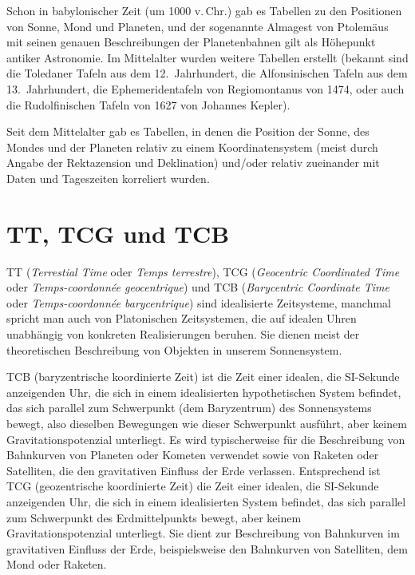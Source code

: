 Schon in babylonischer Zeit (um 1000 v.\,Chr.) gab es Tabellen zu den Positionen von Sonne, Mond und
Planeten, und der sogenannte 
Almagest von Ptolem\"aus mit seinen genauen Beschreibungen der
Planetenbahnen gilt als H\"ohepunkt antiker Astronomie. Im Mittelalter wurden weitere 
Tabellen 
erstellt (bekannt sind die Toledaner Tafeln aus dem 12.\ Jahrhundert, die Alfonsinischen Tafeln 
aus dem 13.\ Jahrhundert, die Ephemeridentafeln von Regiomontanus von 1474, oder 
auch die Rudolfinischen Tafeln von 1627 von Johannes Kepler).  
  
Seit dem Mittelalter gab es Tabellen, in denen die Position der Sonne, des Mondes und der Planeten
relativ zu einem Koordinatensystem (meist durch Angabe der Rektazension und Deklination) 
und/oder relativ zueinander mit Daten und Tageszeiten korreliert wurden. 

\section{TT, TCG und TCB}
 
TT (\textit{Terrestial Time} oder \textit{Temps terrestre}), TCG (\textit{Geocentric Coordinated Time} oder
\textit{Temps-coordonn\'{e}e geocentrique}) und TCB (\textit{Barycentric Coordinate Time} oder
\textit{Temps-coordonn\'{e}e barycentrique}) sind idealisierte Zeitsysteme, manchmal spricht man auch von
Platonischen Zeitsystemen, 
die auf idealen Uhren unabh\"angig von konkreten Realisierungen beruhen.
Sie dienen meist der theoretischen Beschreibung von Objekten in unserem Sonnensystem. 

TCB (baryzentrische koordinierte Zeit) 
ist die Zeit einer idealen, die SI-Sekunde anzeigenden Uhr, 
die sich in einem idealisierten hypothetischen 
System befindet, das sich parallel zum Schwerpunkt (dem Baryzentrum) des Sonnensystems bewegt,
also dieselben Bewegungen wie dieser Schwerpunkt ausf\"uhrt, aber keinem Gravitationspotenzial
unterliegt. Es wird typischerweise f\"ur die Beschreibung von Bahnkurven von Planeten oder Kometen
verwendet sowie von Raketen oder Satelliten, die den gravitativen Einfluss der Erde verlassen. 
Entsprechend ist 
TCG (geozentrische koordinierte Zeit) die Zeit einer idealen, die SI-Sekunde anzeigenden 
Uhr, die sich in einem idealisierten System befindet, das sich parallel zum Schwerpunkt des Erdmittelpunkts 
bewegt, aber keinem Gravitationspotenzial unterliegt. Sie dient zur Beschreibung von Bahnkurven im 
gravitativen Einfluss der Erde, beispielsweise den Bahnkurven von Satelliten, dem Mond oder Raketen. 

